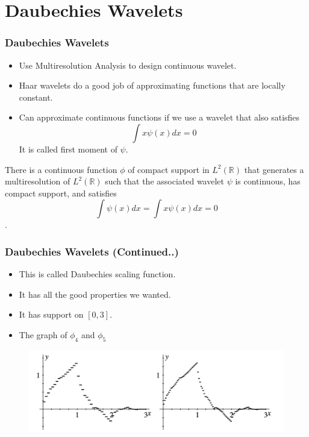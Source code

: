 \documentclass{beamer}
\begin{document}
\section{Daubechies Wavelets} %
\begin{frame}
\frametitle{Daubechies Wavelets}

\begin{itemize}
    \item Use Multiresolution Analysis to design continuous wavelet.
    \item Haar wavelets do a good job of approximating functions that are locally constant.
    \item Can approximate continuous functions if we use a wavelet that also satisfies $$\int x\psi(x) dx = 0$$ It is called first moment of $\psi$.
\end{itemize}

\begin{theorem}[15.5.1]
    There is a continuous function $\phi$ of compact support in $L^2(\mathbb{R}) $
    that generates a multiresolution of $L^2(\mathbb{R})$ such that the associated wavelet $\psi$ is continuous, 
    has compact support, and satisfies $$\int \psi(x) dx = \int x\psi(x) dx = 0$$.
\end{theorem}

\end{frame}

\begin{frame}
    \frametitle{Daubechies Wavelets (Continued..)}
    
    \begin{itemize}
        \item This is called Daubechies scaling function.
        \item It has all the good properties we wanted.
        \item It has support on $[0,3]$.
        \item The graph  of $\phi_4$ and $\phi_5$
    \end{itemize}

    \begin{figure}
        \includegraphics[width=0.8\linewidth]{daubechies.jpg}
    \end{figure}
    
\end{frame}
    
\end{document}
